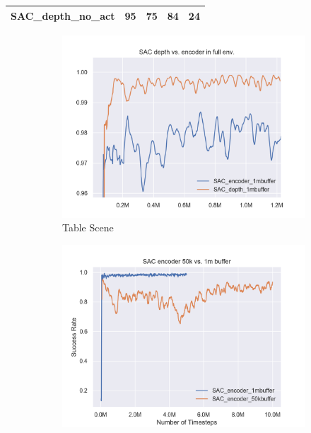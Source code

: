 \begin{table}[!htbp]
\begin{tabular}{|l|l|l|l|l|}
    \textbf{SAC\_depth\_no\_act}  & 95                                                                                          & 75                                                                                         & 84                                                                                          & 24                                                                                         \\ \hline
\end{tabular}
\end{table}


\begin{figure}[!htbp]
    \begin{subfigure}{0.49\textwidth}
        \includegraphics[width=\linewidth]{figures/SACfull/SAC_depth_vs_encoder_in_full_env}
        \caption{Table Scene} \label{fig:table}
    \end{subfigure}%
    \hspace*{\fill}   %
    \begin{subfigure}{0.49\textwidth}
        \includegraphics[width=\linewidth]{figures/SACfull/SAC_encoder_50k_vs_1m_buffer}

\end{subfigure}
\end{figure}
